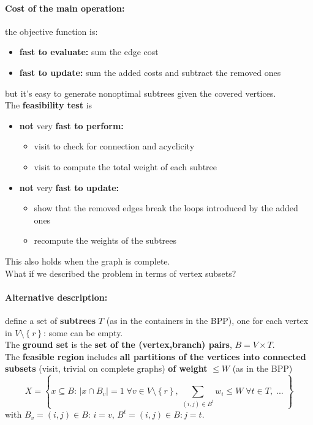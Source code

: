 \paragraph{Cost of the main operation:} the objective function is:
\begin{itemize}
	\item \textbf{fast to evaluate:} sum the edge cost
	\item \textbf{fast to update:} sum the added costs and subtract the removed ones
\end{itemize}
but it's easy to generate nonoptimal subtrees given the covered vertices.\\

The \textbf{feasibility test} is
\begin{itemize}
	\item \textbf{not} very \textbf{fast to perform:} 
	\begin{itemize}
		\item visit to check for connection and acyclicity
		\item visit to compute the total weight of each subtree
	\end{itemize}
	\item \textbf{not} very \textbf{fast to update:} 
	\begin{itemize}
		\item show that the removed edges break the loops introduced by the added ones
		\item recompute the weights of the subtrees
	\end{itemize}
\end{itemize}
This also holds when the graph is complete.\\

What if we described the problem in terms of vertex subsets?

\newpage

\paragraph{Alternative description:} define a set of \textbf{subtrees} $T$ (as in the containers in the BPP), one for each vertex in $V \setminus \left\{r\right\}$: some can be empty.\\

The \textbf{ground set} is the \textbf{set of the (vertex,branch) pairs}, $B = V \times T$.\\

The \textbf{feasible region} includes \textbf{all partitions of the vertices into connected subsets} (visit, trivial on complete graphs) \textbf{of weight} $\leq W$ (as in the BPP)
$$ X = \left\{x \subseteq B : \, |x \cap B_v| = 1 \; \forall v \in V \setminus \left\{r\right\}, \, \sum_{(i,j)\in B^t} w_i \leq W \; \forall t \in T, \; ... \; \right\}$$
with $B_v = {(i, j) \in B : \, i = v }$, $B^t = {(i, j) \in B : j = t}$.\\

